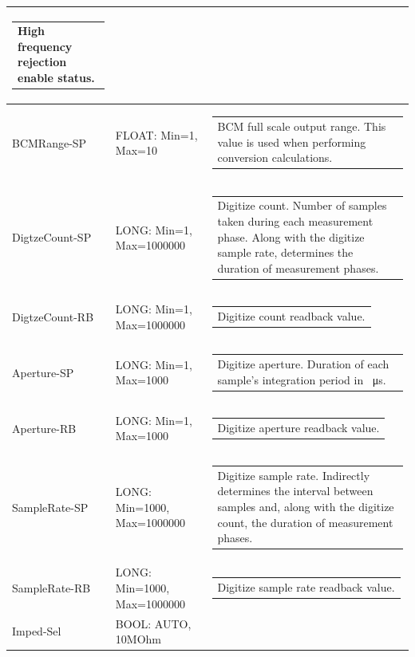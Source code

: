 \documentclass[openany]{article}
\begin{document}
\begin{longtable}{| m{3.0cm} m{4.5cm} m{7.0cm} |}
\begin{tabular}{@{}m{6cm}@{}}
	    					High frequency rejection enable status.
						\end{tabular} \\ \hline
		BCMRange-SP & FLOAT: Min=1, Max=10 & \begin{tabular}{@{}m{6cm}@{}}
	    					BCM full scale output range. This value is used when performing conversion calculations.
						\end{tabular} \\ \hline
		DigtzeCount-SP & LONG: Min=1, Max=1000000 & \begin{tabular}{@{}m{6cm}@{}}
	    					Digitize count. Number of samples taken during each measurement phase. Along with the digitize sample rate, determines the duration of measurement phases.
						\end{tabular} \\ \hline
		DigtzeCount-RB & LONG: Min=1, Max=1000000 & \begin{tabular}{@{}m{6cm}@{}}
	    					Digitize count readback value.
						\end{tabular} \\ \hline
		Aperture-SP & LONG: Min=1, Max=1000 & \begin{tabular}{@{}m{6cm}@{}}
	    					Digitize aperture. Duration of each sample's integration period in \SI{}{\micro\second}.
						\end{tabular} \\ \hline
		Aperture-RB & LONG: Min=1, Max=1000 & \begin{tabular}{@{}m{6cm}@{}}
	    					Digitize aperture readback value.
						\end{tabular} \\ \hline
		SampleRate-SP & LONG: Min=1000, Max=1000000 & \begin{tabular}{@{}m{6cm}@{}}
	    					Digitize sample rate. Indirectly determines the interval between samples and, along with the digitize count, the duration of measurement phases.
						\end{tabular} \\ \hline
		SampleRate-RB & LONG: Min=1000, Max=1000000 & \begin{tabular}{@{}m{6cm}@{}}
	    					Digitize sample rate readback value.
						\end{tabular} \\ \hline
		Imped-Sel & BOOL: AUTO, 10MOhm & \begin{tabular}{@{}m{6cm}@{}}

\end{tabular}
\end{longtable}
\end{document}
